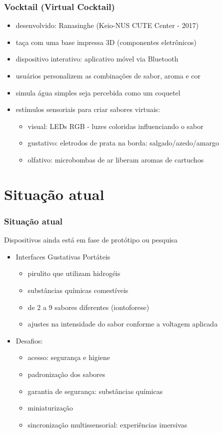 \documentclass{beamer}
\begin{document}
\begin{frame}
  \frametitle{Vocktail (Virtual Cocktail)}
  \begin{itemize}
    \item desenvolvido: Ranasinghe (Keio-NUS CUTE Center - 2017)
    \item taça com uma base impressa 3D (componentes eletrônicos)
    \item dispositivo interativo: aplicativo móvel via Bluetooth
    \item usuários personalizem as combinações de sabor, aroma e cor
    \item simula água simples seja percebida como um coquetel
    \item estímulos sensoriais para criar sabores virtuais:
    \begin{itemize}
      \item visual: LEDs RGB - luzes coloridas influenciando o sabor
      \item gustativo: eletrodos de prata na borda: salgado/azedo/amargo
      \item olfativo: microbombas de ar liberam aromas de cartuchos
    \end{itemize}
  \end{itemize}
\end{frame}

\section{Situação atual}
\begin{frame}
  \frametitle{Situação atual}
  Dispositivos ainda está em fase de protótipo ou pesquisa \\
  \begin{itemize}
    \item Interfaces Gustativas Portáteis
    \begin{itemize}
      \item pirulito que utilizam hidrogéis
      \item substâncias químicas comestíveis
      \item de 2 a 9 sabores diferentes (iontoforese)
      \item ajustes na intensidade do sabor conforme a voltagem aplicada
    \end{itemize}
    \item Desafios:
    \begin{itemize}
      \item acesso: segurança e higiene
      \item padronização dos sabores
      \item garantia de segurança: substâncias químicas
      \item miniaturização
      \item sincronização multissensorial: experiências imersivas
    \end{itemize}
  \end{itemize}
\end{frame}
\end{document}

